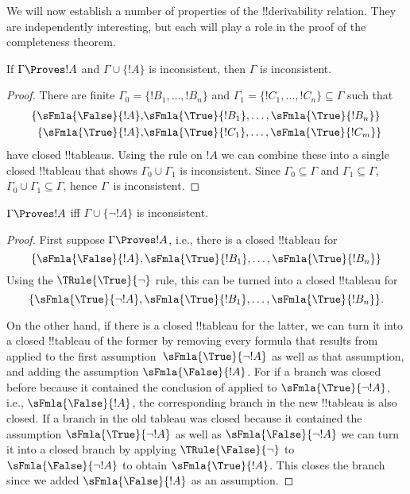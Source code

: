 \documentclass[../../../include/open-logic-section]{subfiles}
\begin{document}
      {}
      {}

We will now establish a number of properties of the !!{derivability}
relation.  They are independently interesting, but each will play a
role in the proof of the completeness theorem.

\begin{prop}
  If $\Gamma \Proves !A$ and $\Gamma \cup \{!A\}$ is
  inconsistent, then $\Gamma$ is inconsistent.
\end{prop}

\begin{proof}
There are finite $\Gamma_0 = \{!B_1, \dots, !B_n\}$ and $\Gamma_1
  =\{!C_1, \dots, !C_n\} \subseteq \Gamma$ such that
  \begin{align*}
    \{\sFmla{\False}{!A}, &
    \sFmla{\True}{!B_1}, \dots, \sFmla{\True}{!B_n}\} \\
    \{\sFmla{\True}{!A}, &
    \sFmla{\True}{!C_1}, \dots, \sFmla{\True}{!C_m}\}
  \end{align*}
  have closed !!{tableau}s.  Using the \Cut{} rule on $!A$ we can
  combine these into a single closed !!{tableau} that shows $\Gamma_0
  \cup \Gamma_1$ is inconsistent.  Since $\Gamma_0
  \subseteq \Gamma$ and $\Gamma_1 \subseteq \Gamma$, $\Gamma_0 \cup
  \Gamma_1 \subseteq \Gamma$, hence $\Gamma$~is inconsistent.
\end{proof}

\begin{prop}
$\Gamma \Proves !A$ iff $\Gamma \cup \{\lnot !A\}$ is inconsistent.
\end{prop}

\begin{proof}
First suppose $\Gamma \Proves !A$, i.e., there is
a closed !!{tableau} for
\[
\{\sFmla{\False}{!A},
\sFmla{\True}{!B_1}, \dots, \sFmla{\True}{!B_n}\}
\]
Using the $\TRule{\True}{\lnot}$ rule, this can be turned into a
closed !!{tableau} for
\[
\{\sFmla{\True}{\lnot !A},
\sFmla{\True}{!B_1}, \dots, \sFmla{\True}{!B_n}\}.
\]

On the other hand, if there is a closed !!{tableau} for the latter, we
can turn it into a closed !!{tableau} of the former by removing every
formula that results from \TRule{\True}{\lnot} applied to the first
assumption~$\sFmla{\True}{\lnot !A}$ as well as that assumption, and
adding the assumption $\sFmla{\False}{!A}$. For if a branch was closed
before because it contained the conclusion of \TRule{\True}{\lnot}
applied to $\sFmla{\True}{\lnot !A}$, i.e., $\sFmla{\False}{!A}$, the
corresponding branch in the new !!{tableau} is also closed. If a
branch in the old tableau was closed because it contained the
assumption $\sFmla{\True}{\lnot !A}$ as well as $\sFmla{\False}{\lnot
  !A}$ we can turn it into a closed branch by applying
$\TRule{\False}{\lnot}$ to $\sFmla{\False}{\lnot !A}$ to obtain
$\sFmla{\True}{!A}$. This closes the branch since we added
$\sFmla{\False}{!A}$ as an assumption.
\end{proof}
\end{document}
